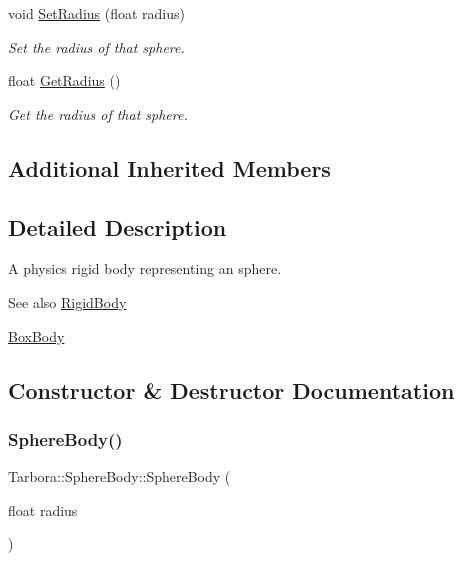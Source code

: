 \begin{DoxyCompactItemize}
void \hyperlink{classTarbora_1_1SphereBody_a218bff80687143aff24f524cc01f2175}{Set\+Radius} (float radius)
\begin{DoxyCompactList}\small\item\em Set the radius of that sphere. \end{DoxyCompactList}\item 
\mbox{\label{classTarbora_1_1SphereBody_a5554aa58df71f4ada4537d48b5e0b1d3}} 
float \hyperlink{classTarbora_1_1SphereBody_a5554aa58df71f4ada4537d48b5e0b1d3}{Get\+Radius} ()
\begin{DoxyCompactList}\small\item\em Get the radius of that sphere. \end{DoxyCompactList}\end{DoxyCompactItemize}
\subsection*{Additional Inherited Members}


\subsection{Detailed Description}
A physics rigid body representing an sphere. 

\begin{DoxySeeAlso}{See also}
\hyperlink{classTarbora_1_1RigidBody}{Rigid\+Body} 

\hyperlink{classTarbora_1_1BoxBody}{Box\+Body} 
\end{DoxySeeAlso}


\subsection{Constructor \& Destructor Documentation}
\mbox{\label{classTarbora_1_1SphereBody_a35e582dfbc4660cb796360ceec62e168}} 
\subsubsection{\texorpdfstring{Sphere\+Body()}{SphereBody()}}
{\footnotesize\ttfamily Tarbora\+::\+Sphere\+Body\+::\+Sphere\+Body (\begin{DoxyParamCaption}\item[{float}]{radius }\end{DoxyParamCaption})}



